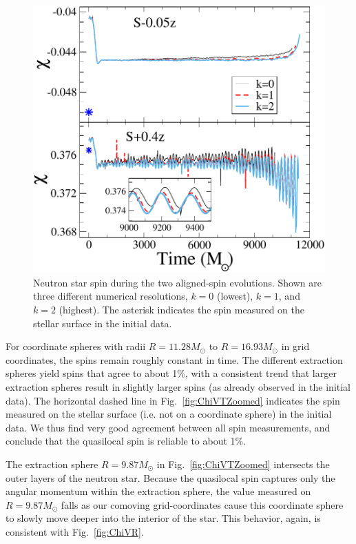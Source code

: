 \begin{figure}
\includegraphics[width=0.99\columnwidth]{chap2/ChiVTDifferentRes2}
\caption[Neutron star spin during the two aligned-spin evolutions.]{{\label{fig:ChiVTDifferentRes2}} Neutron star spin during the
  two aligned-spin evolutions. Shown are three different numerical
  resolutions, $k=0$ (lowest), $k=1$, and $k=2$ (highest). The
  asterisk indicates the spin measured on the stellar surface in the
  initial data.}
\end{figure}

For coordinate spheres with radii $R=11.28M_\odot$ to $R=16.93M_\odot$
in grid coordinates, the spins remain roughly constant in time. The
different extraction spheres yield spins that agree to about 1\%, with
a consistent trend that larger extraction spheres result in slightly
larger spins (as already observed in the initial data). The
horizontal dashed line in Fig.~\ref{fig:ChiVTZoomed} indicates the
spin measured on the stellar surface (i.e. not on a coordinate sphere)
in the initial data. We thus find very good agreement between all
spin measurements, and conclude that the quasilocal spin is reliable
to about 1\%.

The extraction sphere $R=9.87M_\odot$ in Fig.~\ref{fig:ChiVTZoomed}
intersects the outer layers of the neutron star. Because the
quasilocal spin captures only the angular momentum within the
extraction sphere, the value measured on $R=9.87M_\odot$ falls as our
comoving grid-coordinates cause this coordinate sphere to slowly move
deeper into the interior of the star. This behavior, again, is
consistent with Fig.~\ref{fig:ChiVR}.

